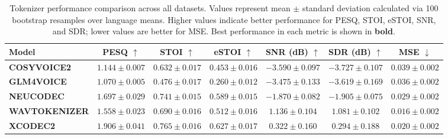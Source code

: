 \begin{table}[ht]
\centering
\caption{Tokenizer performance comparison across all datasets. Values represent mean $\pm$ standard deviation calculated via 100 bootstrap resamples over language means. Higher values indicate better performance for PESQ, STOI, eSTOI, SNR, and SDR; lower values are better for MSE. Best performance in each metric is shown in \textbf{bold}.}
\label{tab:tokenizer_benchmark}
\begin{tabular}{lcccccc}
\toprule
Model & PESQ $\uparrow$ & STOI $\uparrow$ & eSTOI $\uparrow$ & SNR (dB) $\uparrow$ & SDR (dB) $\uparrow$ & MSE $\downarrow$ \\
\midrule
\textbf{COSYVOICE2} & $1.144 \pm 0.007$ & $0.632 \pm 0.017$ & $0.453 \pm 0.016$ & $-3.590 \pm 0.097$ & $-3.727 \pm 0.107$ & $0.039 \pm 0.002$ \\
\textbf{GLM4VOICE} & $1.070 \pm 0.005$ & $0.476 \pm 0.017$ & $0.260 \pm 0.012$ & $-3.475 \pm 0.133$ & $-3.619 \pm 0.169$ & $0.036 \pm 0.002$ \\
\textbf{NEUCODEC} & $1.697 \pm 0.029$ & $0.741 \pm 0.015$ & $0.589 \pm 0.015$ & $-1.870 \pm 0.082$ & $-1.905 \pm 0.075$ & $0.029 \pm 0.002$ \\
\textbf{WAVTOKENIZER} & $1.558 \pm 0.023$ & $0.690 \pm 0.016$ & $0.512 \pm 0.016$ & $\mathbf{1.136 \pm 0.104}$ & $\mathbf{1.081 \pm 0.102}$ & $\mathbf{0.016 \pm 0.002}$ \\
\textbf{XCODEC2} & $\mathbf{1.906 \pm 0.041}$ & $\mathbf{0.765 \pm 0.016}$ & $\mathbf{0.627 \pm 0.017}$ & $0.322 \pm 0.160$ & $0.294 \pm 0.188$ & $0.020 \pm 0.002$ \\
\bottomrule
\end{tabular}
\end{table}